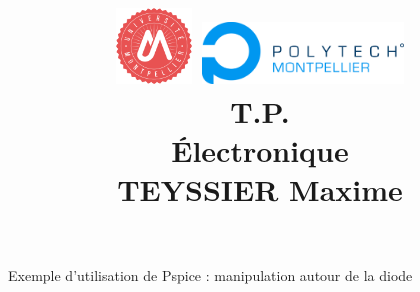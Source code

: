 \documentclass[a4paper,12pt,titlepage]{article}
\title{
    \includegraphics[width=0.15\textwidth]{../logos/UM.png}
    \hspace{1cm}    
    \includegraphics[width=0.4\textwidth]{../logos/Polytech.png}\\
    \vspace{5cm}
    \textbf{T.P.\\Électronique}\\ TEYSSIER Maxime\\
    \vfill
}
\begin{document}
\maketitle
\newpage

\begin{center}
    \Large{Exemple d’utilisation de Pspice : manipulation autour de la diode}
\end{center}
\end{document}
